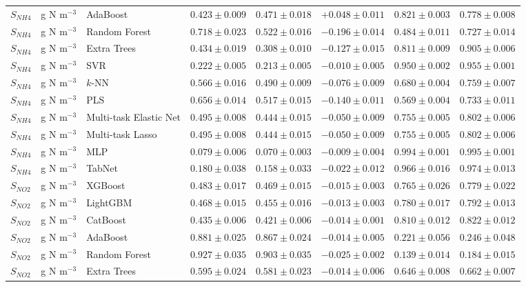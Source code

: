 \begin{longtable}{llp{3.1cm}rrrrr}
$S_{NH4}$ & g N m$^{-3}$ & AdaBoost & $0.423\pm0.009$ & $0.471\pm0.018$ & $+0.048\pm0.011$ & $0.821\pm0.003$ & $0.778\pm0.008$ \\
$S_{NH4}$ & g N m$^{-3}$ & Random Forest & $0.718\pm0.023$ & $0.522\pm0.016$ & $-0.196\pm0.014$ & $0.484\pm0.011$ & $0.727\pm0.014$ \\
$S_{NH4}$ & g N m$^{-3}$ & Extra Trees & $0.434\pm0.019$ & $0.308\pm0.010$ & $-0.127\pm0.015$ & $0.811\pm0.009$ & $0.905\pm0.006$ \\
$S_{NH4}$ & g N m$^{-3}$ & SVR & $0.222\pm0.005$ & $0.213\pm0.005$ & $-0.010\pm0.005$ & $0.950\pm0.002$ & $0.955\pm0.001$ \\
$S_{NH4}$ & g N m$^{-3}$ & $k$-NN & $0.566\pm0.016$ & $0.490\pm0.009$ & $-0.076\pm0.009$ & $0.680\pm0.004$ & $0.759\pm0.007$ \\
$S_{NH4}$ & g N m$^{-3}$ & PLS & $0.656\pm0.014$ & $0.517\pm0.015$ & $-0.140\pm0.011$ & $0.569\pm0.004$ & $0.733\pm0.011$ \\
$S_{NH4}$ & g N m$^{-3}$ & Multi-task Elastic Net & $0.495\pm0.008$ & $0.444\pm0.015$ & $-0.050\pm0.009$ & $0.755\pm0.005$ & $0.802\pm0.006$ \\
$S_{NH4}$ & g N m$^{-3}$ & Multi-task Lasso & $0.495\pm0.008$ & $0.444\pm0.015$ & $-0.050\pm0.009$ & $0.755\pm0.005$ & $0.802\pm0.006$ \\
$S_{NH4}$ & g N m$^{-3}$ & MLP & $0.079\pm0.006$ & $0.070\pm0.003$ & $-0.009\pm0.004$ & $0.994\pm0.001$ & $0.995\pm0.001$ \\
$S_{NH4}$ & g N m$^{-3}$ & TabNet & $0.180\pm0.038$ & $0.158\pm0.033$ & $-0.022\pm0.012$ & $0.966\pm0.016$ & $0.974\pm0.013$ \\
$S_{NO2}$ & g N m$^{-3}$ & XGBoost & $0.483\pm0.017$ & $0.469\pm0.015$ & $-0.015\pm0.003$ & $0.765\pm0.026$ & $0.779\pm0.022$ \\
$S_{NO2}$ & g N m$^{-3}$ & LightGBM & $0.468\pm0.015$ & $0.455\pm0.016$ & $-0.013\pm0.003$ & $0.780\pm0.017$ & $0.792\pm0.013$ \\
$S_{NO2}$ & g N m$^{-3}$ & CatBoost & $0.435\pm0.006$ & $0.421\pm0.006$ & $-0.014\pm0.001$ & $0.810\pm0.012$ & $0.822\pm0.012$ \\
$S_{NO2}$ & g N m$^{-3}$ & AdaBoost & $0.881\pm0.025$ & $0.867\pm0.024$ & $-0.014\pm0.005$ & $0.221\pm0.056$ & $0.246\pm0.048$ \\
$S_{NO2}$ & g N m$^{-3}$ & Random Forest & $0.927\pm0.035$ & $0.903\pm0.035$ & $-0.025\pm0.002$ & $0.139\pm0.014$ & $0.184\pm0.015$ \\
$S_{NO2}$ & g N m$^{-3}$ & Extra Trees & $0.595\pm0.024$ & $0.581\pm0.023$ & $-0.014\pm0.006$ & $0.646\pm0.008$ & $0.662\pm0.007$ \\

\end{longtable}
